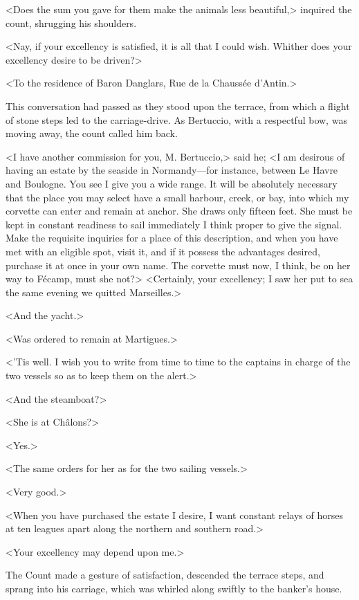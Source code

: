  <Does the sum you gave for them make the animals less beautiful,> inquired the count, shrugging his shoulders. 

 <Nay, if your excellency is satisfied, it is all that I could wish. Whither does your excellency desire to be driven?> 

 <To the residence of Baron Danglars, Rue de la Chaussée d'Antin.> 

 This conversation had passed as they stood upon the terrace, from which a flight of stone steps led to the carriage-drive. As Bertuccio, with a respectful bow, was moving away, the count called him back. 

 <I have another commission for you, M. Bertuccio,> said he; <I am desirous of having an estate by the seaside in Normandy—for instance, between Le Havre and Boulogne. You see I give you a wide range. It will be absolutely necessary that the place you may select have a small harbour, creek, or bay, into which my corvette can enter and remain at anchor. She draws only fifteen feet. She must be kept in constant readiness to sail immediately I think proper to give the signal. Make the requisite inquiries for a place of this description, and when you have met with an eligible spot, visit it, and if it possess the advantages desired, purchase it at once in your own name. The corvette must now, I think, be on her way to Fécamp, must she not?>  <Certainly, your excellency; I saw her put to sea the same evening we quitted Marseilles.> 

 <And the yacht.> 

 <Was ordered to remain at Martigues.> 

 <'Tis well. I wish you to write from time to time to the captains in charge of the two vessels so as to keep them on the alert.> 

 <And the steamboat?> 

 <She is at Châlons?> 

 <Yes.> 

 <The same orders for her as for the two sailing vessels.> 

 <Very good.> 

 <When you have purchased the estate I desire, I want constant relays of horses at ten leagues apart along the northern and southern road.> 

 <Your excellency may depend upon me.> 

 The Count made a gesture of satisfaction, descended the terrace steps, and sprang into his carriage, which was whirled along swiftly to the banker's house. 

